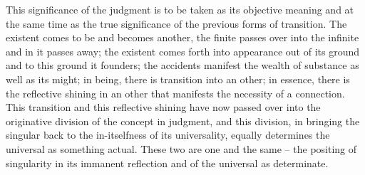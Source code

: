This significance of the judgment is to be taken as its objective meaning
and at the same time as the true significance of the previous forms of
transition. The existent comes to be and becomes another, the finite passes
over into the infinite and in it passes away; the existent comes forth into
appearance out of its ground and to this ground it founders; the accidents
manifest the wealth of substance as well as its might; in being, there is
transition into an other; in essence, there is the reflective shining in an
other that manifests the necessity of a connection. This transition and this
reflective shining have now passed over into the originative division of the
concept in judgment, and this division, in bringing the singular back to the
in-itselfness of its universality, equally determines the universal as something
actual. These two are one and the same – the positing of singularity in its
immanent reflection and of the universal as determinate.

